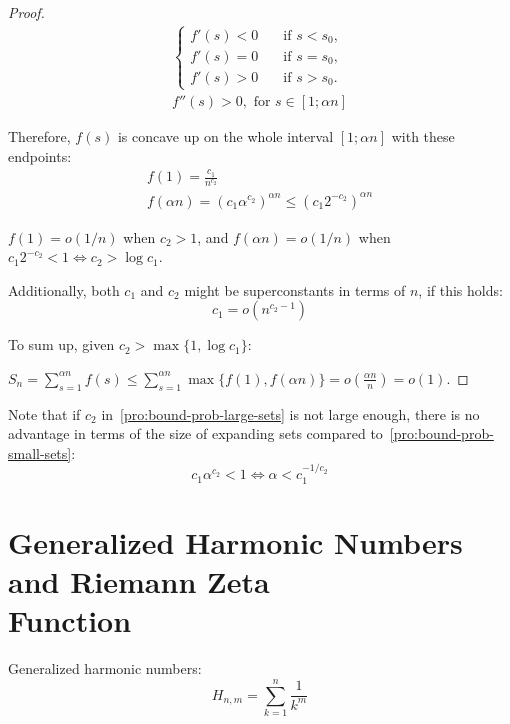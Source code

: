 \begin{proof}
    \begin{gather}
        \begin{cases}
            f'(s)<0 & \quad \text{if } s<s_0,\\
            f'(s)=0 & \quad \text{if } s=s_0,\\
            f'(s)>0 & \quad \text{if } s>s_0.
        \end{cases}\\
        f''(s)>0,\text{ for }s\in[1;\alpha n]
    \end{gather}
    
    Therefore, $f(s)$ is concave up on the whole interval
    $[1;\alpha n]$ with these endpoints:
    \begin{gather}
        f(1)=\frac{c_1}{n^{c_2}}\\
        f(\alpha n)=\left(c_1\alpha^{c_2}\right)^{\alpha n}
        \leq\left(c_1 2^{-c_2}\right)^{\alpha n}
    \end{gather}
    
    $f(1)=o(1/n)$ when $c_2>1$, and $f(\alpha n)=o(1/n)$
    when $c_1 2^{-c_2}<1\iff c_2>\log c_1$.
    
    Additionally, both $c_1$ and $c_2$ might be superconstants in terms of $n$,
    if this holds:
    \begin{equation}
        c_1=o\left(n^{c_2-1}\right)
    \end{equation}

    To sum up, given $c_2>\max\{1,\log c_1\}$:
    
    $S_n=\sum_{s=1}^{\alpha n}{f(s)}
    \leq\sum_{s=1}^{\alpha n}{\max\{f(1),f(\alpha n)\}}
    =o\left(\frac{\alpha n}{n}\right)=o(1)$.
\end{proof}

Note that if $c_2$ in~\autoref{pro:bound-prob-large-sets} is not large enough,
there is no advantage in terms of the size of expanding sets
compared to~\autoref{pro:bound-prob-small-sets}:
\begin{equation}
    c_1\alpha^{c_2}<1\iff\alpha<c_1^{-1/c_2}
\end{equation}

\section[Generalized Harmonic Numbers and Riemann Zeta Function]
        {Generalized Harmonic Numbers and Riemann Zeta\\Function}

Generalized harmonic numbers:
\begin{equation}
    H_{n,m}=\sum_{k=1}^{n}\frac{1}{k^m}
\end{equation}

